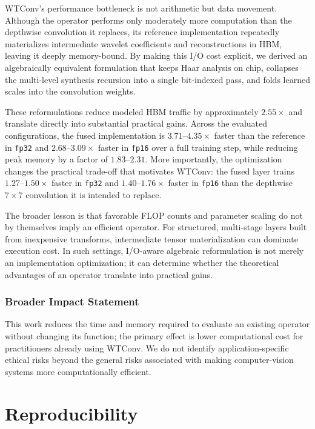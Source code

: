 \documentclass[10pt]{article} %
\theoremstyle{plain}
\begin{document}
WTConv's performance bottleneck is not arithmetic but data movement. Although the operator performs only moderately more computation than the depthwise convolution it replaces, its reference implementation repeatedly materializes intermediate wavelet coefficients and reconstructions in HBM, leaving it deeply memory-bound. By making this I/O cost explicit, we derived an algebraically equivalent formulation that keeps Haar analysis on chip, collapses the multi-level synthesis recursion into a single bit-indexed pass, and folds learned scales into the convolution weights.

These reformulations reduce modeled HBM traffic by approximately $2.55\times$ and translate directly into substantial practical gains. Across the evaluated configurations, the fused implementation is $3.71$--$4.35\times$ faster than the reference in \texttt{fp32} and $2.68$--$3.09\times$ faster in \texttt{fp16} over a full training step, while reducing peak memory by a factor of $1.83$--$2.31$. More importantly, the optimization changes the practical trade-off that motivates WTConv: the fused layer trains $1.27$--$1.50\times$ faster in \texttt{fp32} and $1.40$--$1.76\times$ faster in \texttt{fp16} than the depthwise $7\times7$ convolution it is intended to replace.

The broader lesson is that favorable FLOP counts and parameter scaling do not by themselves imply an efficient operator. For structured, multi-stage layers built from inexpensive transforms, intermediate tensor materialization can dominate execution cost. In such settings, I/O-aware algebraic reformulation is not merely an implementation optimization; it can determine whether the theoretical advantages of an operator translate into practical gains.


\subsubsection*{Broader Impact Statement}
This work reduces the time and memory required to evaluate an existing operator without changing its function; the primary effect is lower computational cost for practitioners already using WTConv. We do not identify application-specific ethical risks beyond the general risks associated with making computer-vision systems more computationally efficient.

\clearpage



\appendix

\clearpage
\section{Reproducibility}
\label{app:reproducibility}

\end{document}
